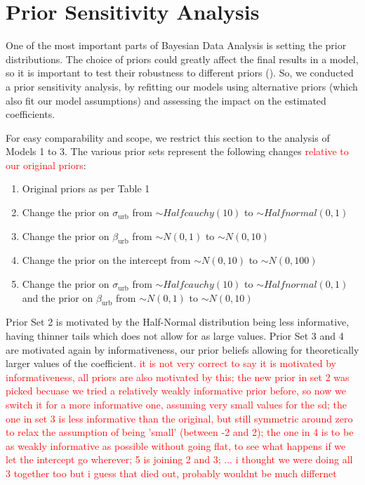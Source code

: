 \documentclass[12pt]{article}
\newcommand{\red}[1]{\textcolor{red}{#1}}
\begin{document}
\section{Prior Sensitivity Analysis}


One of the most important parts of Bayesian Data Analysis is setting the prior distributions. The choice of priors could greatly affect the final results in a model, so it is important to test their robustness to different priors (\cite{PriorSensAnalysis}).
So, we conducted a prior sensitivity analysis, by refitting our models using alternative priors (which also fit our model assumptions) and assessing the impact on the estimated coefficients.

For easy comparability and scope, we restrict this section to the analysis of Models 1 to 3. The various prior sets represent the following changes \red{relative to our original priors}:

\begin{enumerate}
    \item Original priors as per Table 1
    \item Change the prior on \(\sigma_\text{urb}\) from \(\sim Halfcauchy(10)\) to \(\sim Halfnormal(0, 1)\)
    \item Change  the prior on \(\beta_\text{urb}\) from \(\sim N(0, 1)\) to \(\sim N(0, 10)\)
    \item Change  the prior on the intercept from \(\sim N(0, 10)\) to \(\sim N(0, 100)\)
    \item Change the prior on \(\sigma_\text{urb}\) from \(\sim Halfcauchy(10)\) to \(\sim Halfnormal(0, 1)\) and the prior on \(\beta_\text{urb}\) from \(\sim N(0, 1)\) to \(\sim N(0, 10)\)
\end{enumerate}

Prior Set 2 is motivated by the Half-Normal distribution being less informative, having thinner tails which does not allow for as large values. Prior Set 3 and 4 are motivated again by informativeness, our prior beliefs allowing for theoretically larger values of the coefficient.
\red{it is not very correct to say it is motivated by informativeness, all priors are also motivated by this; the new prior in set 2 was picked becuase we tried a relatively weakly informative prior before, so now we switch it for a more informative one, assuming very small values for the sd; the one in set 3 is less informative than the original, but still symmetric around zero to relax the assumption of being 'small' (between -2 and 2); the one in 4 is to be as weakly informative as possible without going flat, to see what happens if we let the intercept go wherever; 5 is joining 2 and 3; ... i thought we were doing all 3 together too but i guess that died out, probably wouldnt be much differnet}
\end{document}
